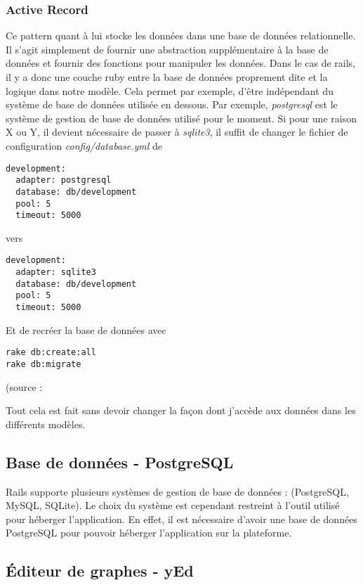 \subsubsection{Active Record}
Ce pattern quant à lui stocke les données dans une base de données relationnelle. Il s'agit simplement de fournir une abstraction supplémentaire à la base de données et fournir des fonctions pour manipuler les données. Dans le cas de rails, il y a donc une couche ruby entre la base de données proprement dite et la logique dans notre modèle. Cela permet par exemple, d'être indépendant du système de base de données utilisée en dessous.  Par exemple, \textit{postgresql} est le système de gestion de base de données utilisé pour le moment. Si pour une raison X ou Y, il devient nécessaire de passer à \textit{sqlite3}, il suffit de changer le fichier de configuration \textit{config/database.yml} de
\begin{lstlisting}
development:
  adapter: postgresql
  database: db/development
  pool: 5
  timeout: 5000
\end{lstlisting}
vers
\begin{lstlisting}
development:
  adapter: sqlite3
  database: db/development
  pool: 5
  timeout: 5000
\end{lstlisting}

Et de recréer la base de données avec
\begin{lstlisting}
rake db:create:all
rake db:migrate
\end{lstlisting}

(source : \cite{rails_cast_migration_to_postgresql}

Tout cela est fait sans devoir changer la façon dont j'accède aux données dans les différents modèles.  

\subsection{Base de données - PostgreSQL}

Rails supporte plusieurs systèmes de gestion de base de données : (PostgreSQL, MySQL, SQLite). Le choix du système est cependant restreint à l'outil utilisé pour héberger l'application. En effet, il est nécessaire d'avoir une base de données PostgreSQL pour pouvoir héberger l'application sur la plateforme. 

\subsection{Éditeur de graphes - yEd}

